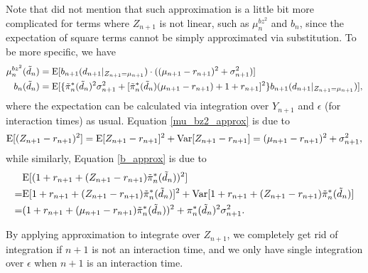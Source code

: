 Note that  did not mention that such approximation is a little bit more complicated for terms where $Z_{n+1}$ is not linear, such as $\mu_n^{bz^2}$ and $b_n$, since the expectation of square terms cannot be simply approximated via substitution. To be more specific, we have\begin{align}
    \mu_n^{bz^2}(\tilde d_n)&=\mathrm{E}[b_{n+1}(d_{n+1}|_{Z_{n+1}=\mu_{n+1}})\cdot ((\mu_{n+1}-r_{n+1})^2+\sigma_{n+1}^2)]\label{mu_bz2_approx}\\
    b_n(\tilde d_n)&=\mathrm{E}[\{\tilde\pi_n^*(\tilde d_n)^2\sigma_{n+1}^2+[\tilde\pi_n^*(\tilde d_n)(\mu_{n+1}-r_{n+1})+1+r_{n+1}]^2\}b_{n+1}(d_{n+1}|_{Z_{n+1}=\mu_{n+1}})]\label{b_approx},
\end{align} where the expectation can be calculated via integration over $Y_{n+1}$ and $\epsilon$ (for interaction times) as usual. Equation \eqref{mu_bz2_approx} is due to $$
    \begin{aligned}
        \mathrm{E}[(Z_{n+1}-r_{n+1})^2]=\mathrm{E}[Z_{n+1}-r_{n+1}]^2+\mathrm{Var}[Z_{n+1}-r_{n+1}]=(\mu_{n+1}-r_{n+1})^2+\sigma_{n+1}^2,
    \end{aligned}
$$ while similarly, Equation \eqref{b_approx} is due to $$
    \begin{aligned}
        &\mathrm{E}[(1+r_{n+1}+(Z_{n+1}-r_{n+1})\tilde\pi_n^*(\tilde d_n))^2]\\
        =&\mathrm{E}[1+r_{n+1}+(Z_{n+1}-r_{n+1})\tilde\pi_n^*(\tilde d_n)]^2+\mathrm{Var}[1+r_{n+1}+(Z_{n+1}-r_{n+1})\tilde\pi_n^*(\tilde d_n)]\\
        =&(1+r_{n+1}+(\mu_{n+1}-r_{n+1})\tilde\pi_n^*(\tilde d_n))^2+\pi_n^*(\tilde d_n)^2\sigma_{n+1}^2.
    \end{aligned}
$$

By applying approximation to integrate over $Z_{n+1}$, we completely get rid of integration if $n+1$ is not an interaction time, and we only have single integration over $\epsilon$ when $n+1$ is an interaction time.



